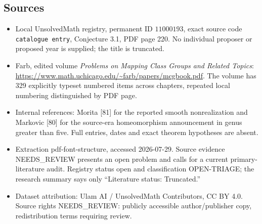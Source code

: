 \documentclass[11pt]{article}
\begin{document}
\subsection{Sources}
\begin{itemize}
\item Local UnsolvedMath registry, permanent ID \(11000193\), exact source code \texttt{catalogue entry}, Conjecture 3.1, PDF page 220. No individual proposer or proposed year is supplied; the title is truncated.
\item Farb, edited volume \emph{Problems on Mapping Class Groups and Related Topics}: \url{https://www.math.uchicago.edu/~farb/papers/mcgbook.pdf}. The volume has 329 explicitly typeset numbered items across chapters, repeated local numbering distinguished by PDF page.
\item Internal references: Morita [81] for the reported smooth nonrealization and Markovic [80] for the source-era homeomorphism announcement in genus greater than five. Full entries, dates and exact theorem hypotheses are absent.
\item Extraction pdf-font-structure, accessed 2026-07-29. Source evidence NEEDS\_REVIEW presents an open problem and calls for a current primary-literature audit. Registry status open and classification OPEN-TRIAGE; the research summary says only ``Literature status: Truncated.''
\item Dataset attribution: Ulam AI / UnsolvedMath Contributors, CC BY 4.0. Source rights NEEDS\_REVIEW: publicly accessible author/publisher copy, redistribution terms requiring review.
\end{itemize}
\end{document}
